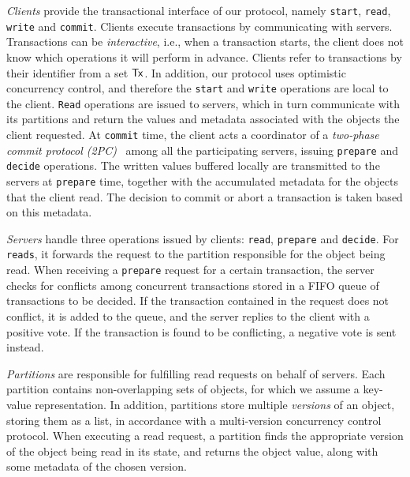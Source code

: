 \emph{Clients} provide the transactional interface of our protocol, namely \texttt{start}, \texttt{read}, \texttt{write} and \texttt{commit}. Clients execute transactions by communicating with servers. Transactions can be \emph{interactive}, i.e., when a transaction starts, the client does not know which operations it will perform in advance. Clients refer to transactions by their identifier from a set ${\sf Tx}$. In addition, our protocol uses optimistic concurrency control, and therefore the \texttt{start} and \texttt{write} operations are local to the client. \texttt{Read} operations are issued to servers, which in turn communicate with its partitions and return the values and metadata associated with the objects the client requested. At \texttt{commit} time, the client acts a coordinator of a \emph{two-phase commit protocol (2PC)}~\citep{bernstein_concurrency} among all the participating servers, issuing \texttt{prepare} and \texttt{decide} operations. The written values buffered locally are transmitted to the servers at \texttt{prepare} time, together with the accumulated metadata for the objects that the client read. The decision to commit or abort a transaction is taken based on this metadata.

\emph{Servers} handle three operations issued by clients: \texttt{read}, \texttt{prepare} and \texttt{decide}. For \texttt{reads}, it forwards the request to the partition responsible for the object being read. When receiving a \texttt{prepare} request for a certain transaction, the server checks for conflicts among concurrent transactions stored in a FIFO queue of transactions to be decided. If the transaction contained in the request does not conflict, it is added to the queue, and the server replies to the client with a positive vote. If the transaction is found to be conflicting, a negative vote is sent instead.

\emph{Partitions} are responsible for fulfilling read requests on behalf of servers. Each partition contains non-overlapping sets of objects, for which we assume a key-value representation. In addition, partitions store multiple \emph{versions} of an object, storing them as a list, in accordance with a multi-version concurrency control protocol. When executing a read request, a partition finds the appropriate version of the object being read in its state, and returns the object value, along with some metadata of the chosen version.

